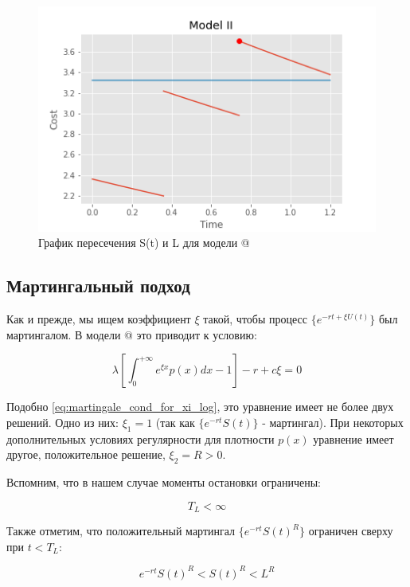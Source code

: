 \documentclass[a4paper,12pt]{article}
\makeatletter
\theoremstyle{definition}
\newcommand*{\rom}[1]{\expandafter\@slowromancap\romannumeral #1@}
\makeatother
\begin{document}

\begin{figure}[htbp]
\label{fig:model2tracklcross}
\centerline{\includegraphics[scale=0.7]{img/model2_with_L.png}}
\caption{График пересечения S(t) и L для модели \rom{2}}
\end{figure}

\subsection{Мартингальный подход}

Как и прежде, мы ищем коэффициент $\xi$ такой, чтобы
процесс $\{e^{-rt + \xi U(t)}\}$ был мартингалом. В модели \rom{2} это приводит к условию:

\begin{equation}\label{eq:martingale_condition_for_mod2}
    \lambda \left[ \int_{0}^{+\infty} e^{\xi x} p(x) dx - 1 \right] - r + c \xi = 0
\end{equation}

Подобно \eqref{eq:martingale_cond_for_xi_log}, это уравнение имеет не более двух решений. Одно из них: $\xi_1 = 1$ (так как $\{e^{-rt} S(t)\}$ - мартингал).
При некоторых дополнительных условиях регулярности для плотности $p(x)$ уравнение имеет другое, положительное решение, $\xi_2 = R > 0$.

Вспомним, что в нашем случае моменты остановки ограничены:

\begin{equation*}
    T_L < \infty
\end{equation*}

Также отметим, что положительный мартингал $\{ e^{-r t} S(t)^R \}$ ограничен сверху при $t < T_L$:

\begin{equation*}
    e^{-r t} S(t)^R < S(t)^R < L^R
\end{equation*}
\end{document}
